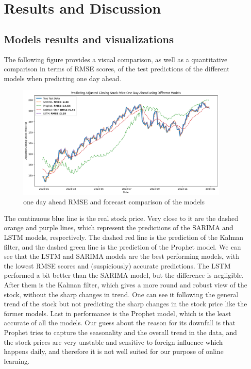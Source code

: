 \documentclass[12pt]{article}
\theoremstyle{definition}
\begin{document}
\section{Results and Discussion}

\subsection{Models results and visualizations}
The following figure provides a visual comparison,
as well as a quantitative comparison in terms of RMSE scores,
of the test predictions of the different models when predicting one day ahead.

\begin{figure}[H]
  \centering
  \includegraphics[width=0.95\textwidth]{Images/one day ahead compilation.png}
  \caption{one day ahead RMSE and forecast comparison of the models}
\end{figure}

The continuous blue line is the real stock price. 
Very close to it are the dashed orange and purple lines, which represent the predictions of the SARIMA and LSTM models, respectively. 
The dashed red line is the prediction of the Kalman filter, and the dashed green line is the prediction of the Prophet model.
We can see that the LSTM and SARIMA models are the best performing models, with the lowest RMSE scores and (suspiciously) accurate predictions.
The LSTM performed a bit better than the SARIMA model, but the difference is negligible.
After them is the Kalman filter, which gives a more round and robust view of the stock, without the sharp changes in trend.
One can see it following the general trend of the stock but not predicting the sharp changes in the stock price like the former models.
Last in performance is the Prophet model, which is the least accurate of all the models. 
Our guess about the reason for its downfall is that Prophet tries to capture the seasonality and the overall trend in the data, and the stock prices are very unstable and sensitive to foreign influence which happens daily, and therefore it is not well suited for our purpose of online learning. 
\end{document}
